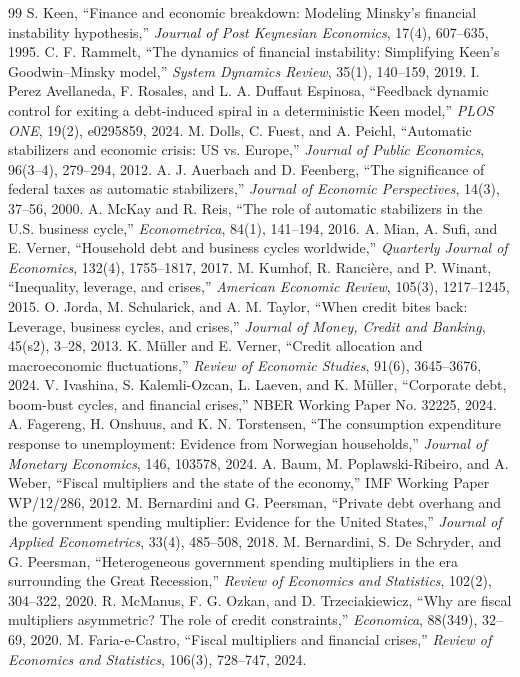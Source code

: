 \documentclass[11pt]{article}
\begin{document}
\begin{thebibliography}{99}
 S. Keen, ``Finance and economic breakdown: Modeling Minsky's financial instability hypothesis,'' \emph{Journal of Post Keynesian Economics}, 17(4), 607--635, 1995.
 C. F. Rammelt, ``The dynamics of financial instability: Simplifying Keen's Goodwin--Minsky model,'' \emph{System Dynamics Review}, 35(1), 140--159, 2019.
 I. Perez Avellaneda, F. Rosales, and L. A. Duffaut Espinosa, ``Feedback dynamic control for exiting a debt-induced spiral in a deterministic Keen model,'' \emph{PLOS ONE}, 19(2), e0295859, 2024.
 M. Dolls, C. Fuest, and A. Peichl, ``Automatic stabilizers and economic crisis: US vs. Europe,'' \emph{Journal of Public Economics}, 96(3--4), 279--294, 2012.
 A. J. Auerbach and D. Feenberg, ``The significance of federal taxes as automatic stabilizers,'' \emph{Journal of Economic Perspectives}, 14(3), 37--56, 2000.
 A. McKay and R. Reis, ``The role of automatic stabilizers in the U.S. business cycle,'' \emph{Econometrica}, 84(1), 141--194, 2016.
 A. Mian, A. Sufi, and E. Verner, ``Household debt and business cycles worldwide,'' \emph{Quarterly Journal of Economics}, 132(4), 1755--1817, 2017.
 M. Kumhof, R. Ranci\`ere, and P. Winant, ``Inequality, leverage, and crises,'' \emph{American Economic Review}, 105(3), 1217--1245, 2015.
 O. Jorda, M. Schularick, and A. M. Taylor, ``When credit bites back: Leverage, business cycles, and crises,'' \emph{Journal of Money, Credit and Banking}, 45(s2), 3--28, 2013.
 K. M\"uller and E. Verner, ``Credit allocation and macroeconomic fluctuations,'' \emph{Review of Economic Studies}, 91(6), 3645--3676, 2024.
 V. Ivashina, S. Kalemli-Ozcan, L. Laeven, and K. M\"uller, ``Corporate debt, boom-bust cycles, and financial crises,'' NBER Working Paper No. 32225, 2024.
 A. Fagereng, H. Onshuus, and K. N. Torstensen, ``The consumption expenditure response to unemployment: Evidence from Norwegian households,'' \emph{Journal of Monetary Economics}, 146, 103578, 2024.
 A. Baum, M. Poplawski-Ribeiro, and A. Weber, ``Fiscal multipliers and the state of the economy,'' IMF Working Paper WP/12/286, 2012.
 M. Bernardini and G. Peersman, ``Private debt overhang and the government spending multiplier: Evidence for the United States,'' \emph{Journal of Applied Econometrics}, 33(4), 485--508, 2018.
 M. Bernardini, S. De Schryder, and G. Peersman, ``Heterogeneous government spending multipliers in the era surrounding the Great Recession,'' \emph{Review of Economics and Statistics}, 102(2), 304--322, 2020.
 R. McManus, F. G. Ozkan, and D. Trzeciakiewicz, ``Why are fiscal multipliers asymmetric? The role of credit constraints,'' \emph{Economica}, 88(349), 32--69, 2020.
 M. Faria-e-Castro, ``Fiscal multipliers and financial crises,'' \emph{Review of Economics and Statistics}, 106(3), 728--747, 2024.
\end{thebibliography}
\end{document}
